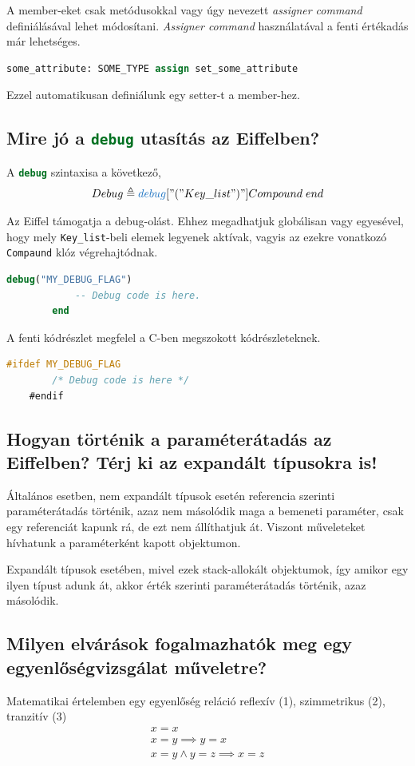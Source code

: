 	A member-eket csak metódusokkal vagy úgy nevezett \textit{assigner command} definiálásával lehet módosítani. \textit{Assigner command} használatával a fenti értékadás már lehetséges.
	\begin{lstlisting}[language=Eiffel]
		some_attribute: SOME_TYPE assign set_some_attribute
	\end{lstlisting}
	Ezzel automatikusan definiálunk egy setter-t a member-hez.
	
\subsection{ Mire jó a \lstinline[language=Eiffel]|debug| utasítás az Eiffelben? }
	A \lstinline[language=Eiffel]|debug| szintaxisa a következő,
	\begin{align*}
	Debug \triangleq \textcolor{RoyalBlue}{debug} [ "("Key\_list ")" ] Compound\; end
	\end{align*}
	
	Az Eiffel támogatja a debug-olást. Ehhez megadhatjuk globálisan vagy egyesével, hogy mely \lstinline[language=Eiffel]|Key_list|-beli elemek legyenek aktívak, vagyis az ezekre vonatkozó \lstinline[language=Eiffel]|Compaund| klóz végrehajtódnak.
	
	\begin{lstlisting}[language=Eiffel]
		debug("MY_DEBUG_FLAG")
			-- Debug code is here.
		end
	\end{lstlisting}
	A fenti kódrészlet megfelel a C-ben megszokott kódrészleteknek.
	\begin{lstlisting}[language=C]
	#ifdef MY_DEBUG_FLAG
		/* Debug code is here */
	#endif
	\end{lstlisting}
	
\subsection{ Hogyan történik a paraméterátadás az Eiffelben? Térj ki az expandált típusokra is! }
	Általános esetben, nem expandált típusok esetén referencia szerinti paraméterátadás történik, azaz nem másolódik maga a bemeneti paraméter, csak egy referenciát kapunk rá, de ezt nem állíthatjuk át. Viszont műveleteket hívhatunk a paraméterként kapott objektumon.
	
	Expandált típusok esetében, mivel ezek stack-allokált objektumok, így amikor egy ilyen típust adunk át, akkor érték szerinti paraméterátadás történik, azaz másolódik.
	
\subsection{ Milyen elvárások fogalmazhatók meg egy egyenlőségvizsgálat műveletre? }
	Matematikai értelemben egy egyenlőség reláció reflexív (1), szimmetrikus (2), tranzitív (3)
	\begin{align}
	x=x\\
	x=y\implies y=x\\
	x=y \wedge y=z\implies x=z
	\end{align}
	 
